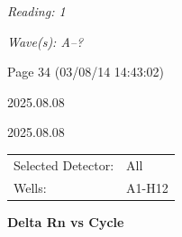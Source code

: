 \documentclass[UTF8,10pt,a4paper,fontset=fandol]{ctexart}
\newcommand{\fieldvalue}[1]{#1}
\newcommand{\handwritten}[1]{#1}
\begin{document}
\noindent
\textit{Reading: 1}

\noindent
\textit{Wave(s): A--?}

\noindent
Page 34 (03/08/14 14:43:02)

\newpage


\handwritten{}

\handwritten{2025.08.08}

\handwritten{}

\handwritten{2025.08.08}

\hfill
\begin{tabular}{@{}ll@{}}
Selected Detector: &%
\fieldvalue{All}\\
Wells: &%
\fieldvalue{A1-H12}
\end{tabular}

\begin{center}
\textbf{Delta Rn vs Cycle}
\end{center}
\end{document}

